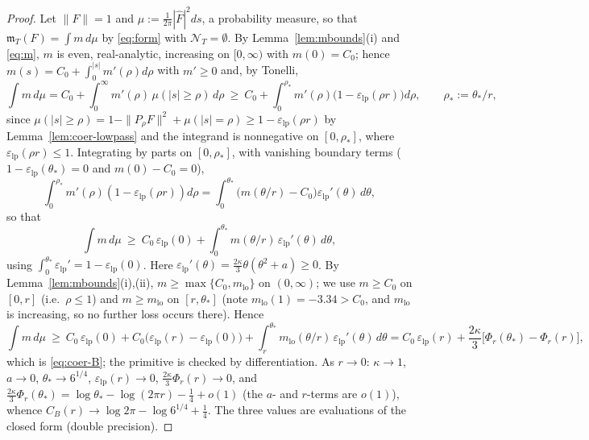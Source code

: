 \documentclass[11pt]{amsart}
\theoremstyle{definition}
\theoremstyle{remark}
\newcommand{\Fh}{\widehat F}
\newcommand{\NT}{\mathcal N_T}
\newcommand{\mT}{\mathfrak m_T}
\begin{document}
\begin{proof}
Let $\|F\|=1$ and $\mu:=\frac1{2\pi}|\Fh|^2ds$, a probability measure, so that $\mT(F)=\int m\,d\mu$ by
\eqref{eq:form} with $\NT=\emptyset$. By Lemma~\ref{lem:mbounds}(i) and \eqref{eq:m}, $m$ is even, real-analytic,
increasing on $[0,\infty)$ with $m(0)=C_0$; hence $m(s)=C_0+\int_0^{|s|}m'(\rho)d\rho$ with $m'\ge0$ and, by Tonelli,
\[
\int m\,d\mu=C_0+\int_0^\infty m'(\rho)\,\mu(|s|\ge\rho)\,d\rho\ \ge\ C_0+\int_0^{\rho_*}m'(\rho)\big(1-\varepsilon_{\mathrm{lp}}(\rho r)\big)d\rho,
\qquad\rho_*:=\theta_*/r,
\]
since $\mu(|s|\ge\rho)=1-\|P_{\rho}F\|^2+\mu(|s|=\rho)\ge1-\varepsilon_{\mathrm{lp}}(\rho r)$ by Lemma~\ref{lem:coer-lowpass} and the
integrand is nonnegative on $[0,\rho_*]$, where $\varepsilon_{\mathrm{lp}}(\rho r)\le1$. Integrating by parts on $[0,\rho_*]$, with
vanishing boundary terms ($1-\varepsilon_{\mathrm{lp}}(\theta_*)=0$ and $m(0)-C_0=0$),
\[
\int_0^{\rho_*}m'(\rho)(1-\varepsilon_{\mathrm{lp}}(\rho r))d\rho=\int_0^{\theta_*}\big(m(\theta/r)-C_0\big)\varepsilon_{\mathrm{lp}}'(\theta)\,d\theta,
\]
so that
\[
\int m\,d\mu\ \ge\ C_0\,\varepsilon_{\mathrm{lp}}(0)+\int_0^{\theta_*}m(\theta/r)\,\varepsilon_{\mathrm{lp}}'(\theta)\,d\theta ,
\]
using $\int_0^{\theta_*}\varepsilon_{\mathrm{lp}}'=1-\varepsilon_{\mathrm{lp}}(0)$. Here $\varepsilon_{\mathrm{lp}}'(\theta)=\frac{2\kappa}3\theta(\theta^2+a)\ge0$. By
Lemma~\ref{lem:mbounds}(i),(ii), $m\ge\max\{C_0,m_{\mathrm{lo}}\}$ on $(0,\infty)$; we use $m\ge C_0$ on $[0,r]$ (i.e.\ $\rho\le1$)
and $m\ge m_{\mathrm{lo}}$ on $[r,\theta_*]$ (note $m_{\mathrm{lo}}(1)=-3.34>C_0$, and $m_{\mathrm{lo}}$ is increasing, so no further loss occurs
there). Hence
\[
\int m\,d\mu\ \ge\ C_0\,\varepsilon_{\mathrm{lp}}(0)+C_0\big(\varepsilon_{\mathrm{lp}}(r)-\varepsilon_{\mathrm{lp}}(0)\big)+\int_r^{\theta_*}m_{\mathrm{lo}}(\theta/r)\,\varepsilon_{\mathrm{lp}}'(\theta)\,d\theta
=C_0\,\varepsilon_{\mathrm{lp}}(r)+\frac{2\kappa}3\big[\Phi_r(\theta_*)-\Phi_r(r)\big],
\]
which is \eqref{eq:coer-B}; the primitive is checked by differentiation. As $r\to0$: $\kappa\to1$, $a\to0$,
$\theta_*\to6^{1/4}$, $\varepsilon_{\mathrm{lp}}(r)\to0$, $\frac{2\kappa}3\Phi_r(r)\to0$, and
$\frac{2\kappa}3\Phi_r(\theta_*)=\log\theta_*-\log(2\pi r)-\frac14+o(1)$ (the $a$- and $r$-terms are $o(1)$),
whence $C_B(r)\to\log2\pi-\log6^{1/4}+\frac14$. The three values are evaluations of the closed form (double precision).
\end{proof}
\end{document}
